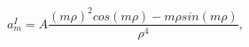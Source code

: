 \begin{equation}
 a^I_m= A \frac{(m \rho)^2 cos(m \rho)-m \rho sin(m \rho)}{\rho^4}, 
\end{equation}

